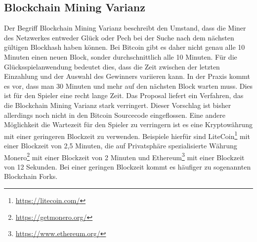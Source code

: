 \subsection{Blockchain Mining Varianz}
Der Begriff Blockchain Mining Varianz beschreibt den Umstand, dass die Miner des Netzwerkes entweder Glück oder Pech bei der Suche nach dem nächsten gültigen Blockhash haben können. Bei Bitcoin gibt es daher nicht genau alle 10 Minuten einen neuen Block, sonder durchschnittlich alle 10 Minuten. Für die Glücksspielanwendung bedeutet dies, dass die Zeit zwischen der letzten Einzahlung und der Auswahl des Gewinners variieren kann. In der Praxis kommt es vor, dass man 30 Minuten und mehr auf den nächsten Block warten muss. Dies ist für den Spieler eine recht lange Zeit. Das Proposal \cite{bobtail} liefert ein Verfahren, das die Blockchain Mining Varianz stark verringert. Dieser Vorschlag ist bisher allerdings noch nicht in den Bitcoin Sourcecode eingeflossen.
Eine andere Möglichkeit die Wartezeit für den Spieler zu verringern ist es eine  Kryptowährung mit einer geringeren Blockzeit zu verwenden. Beispiele hierfür sind LiteCoin\footnote{\url{https://litecoin.com/}} mit einer Blockzeit von 2,5 Minuten, die auf Privatsphäre spezialisierte Währung Monero\footnote{\url{https://getmonero.org/}} mit einer Blockzeit von 2 Minuten und Ethereum\footnote{\url{https://www.ethereum.org/}} mit einer Blockzeit von 12 Sekunden. Bei einer geringen Blockzeit kommt es häufiger zu sogenannten Blockchain Forks. 

